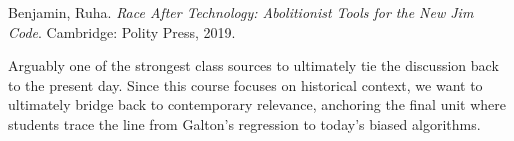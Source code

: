 \documentclass[12pt]{article}
\begin{document}
\begin{bibentry}
Benjamin, Ruha. \textit{Race After Technology: Abolitionist Tools for the New Jim Code}. Cambridge: Polity Press, 2019.
\end{bibentry}
\begin{annotation}
Arguably one of the strongest class sources to ultimately tie the discussion back to the present day. Since this course focuses on historical context, we want to ultimately bridge back to contemporary relevance, anchoring the final unit where students trace the line from Galton's regression to today's biased algorithms.
\end{annotation}
\end{document}
